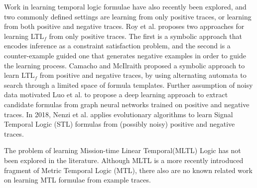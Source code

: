 \documentclass[runningheads]{llncs}
\begin{document}
Work in learning temporal logic formulae have also recently been explored, and two commonly defined settings are learning from only positive traces, or learning from both positive and negative traces.
Roy et al.\cite{roy_ltlf_learning} proposes two approaches for learning LTL$_f$ from only positive traces. 
The first is a symbolic approach that encodes inference as a constraint satisfaction problem, and the second is a counter-example guided one that generates negative examples in order to guide the learning process. 
Camacho and McIlraith \cite{camacho_ltlf_learning} proposed a symbolic approach to learn LTL$_f$ from positive and negative traces, by using alternating automata to search through a limited space of formula templates.
Further assumption of noisy data motivated Luo et al.\cite{Luo_Liang_Du_Wan_Peng_Zhang_2022} to propose a deep learning approach to extract candidate formulas from graph neural networks trained on positive and negative traces.
In 2018, Nenzi et al. applies evolutionary algorithms to learn Signal Temporal Logic (STL) formulas from (possibly noisy) positive and negative traces. 

The problem of learning Mission-time Linear Temporal(MLTL) Logic has not been explored in the literature. Although MLTL is a more recently introduced fragment of Metric Temporal Logic (MTL), there also are no known related work on learning MTL formulae from example traces. 
\end{document}
